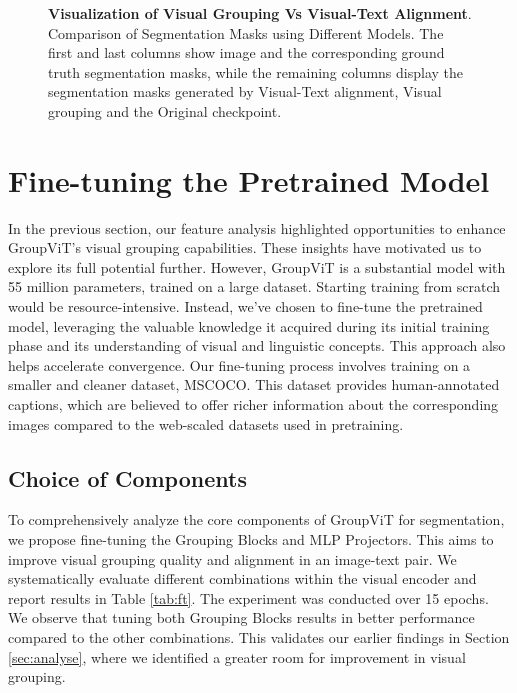 \begin{figure}
\caption[\textbf{Visualization of Visual Grouping Vs Visual-Text Alignment}]{\textbf{Visualization of Visual Grouping Vs Visual-Text Alignment}. Comparison of Segmentation Masks using Different Models. The first and last columns show image and the corresponding ground truth segmentation masks, while the remaining columns display the segmentation masks generated by Visual-Text alignment, Visual grouping and the Original checkpoint.}
    
\end{figure}





\section{Fine-tuning the Pretrained Model}
In the previous section, our feature analysis highlighted opportunities to enhance GroupViT's visual grouping capabilities. These insights have motivated us to explore its full potential further. However, GroupViT is a substantial model with 55 million parameters, trained on a large dataset. Starting training from scratch would be resource-intensive. Instead, we've chosen to fine-tune the pretrained model, leveraging the valuable knowledge it acquired during its initial training phase and its understanding of visual and linguistic concepts. This approach also helps accelerate convergence. Our fine-tuning process involves training on a smaller and cleaner dataset, MSCOCO. This dataset provides human-annotated captions, which are believed to offer richer information about the corresponding images compared to the web-scaled datasets used in pretraining.

\subsection{Choice of Components}
To comprehensively analyze the core components of GroupViT for segmentation, we propose fine-tuning the Grouping Blocks and MLP Projectors. This aims to improve visual grouping quality and alignment in an image-text pair. We systematically evaluate different combinations within the visual encoder and report results in Table \ref{tab:ft}. 
The experiment was conducted over 15 epochs.
We observe that tuning both Grouping Blocks results in better performance compared to the other combinations. This validates our earlier findings in Section \ref{sec:analyse}, where we identified a greater room for improvement in visual grouping.


